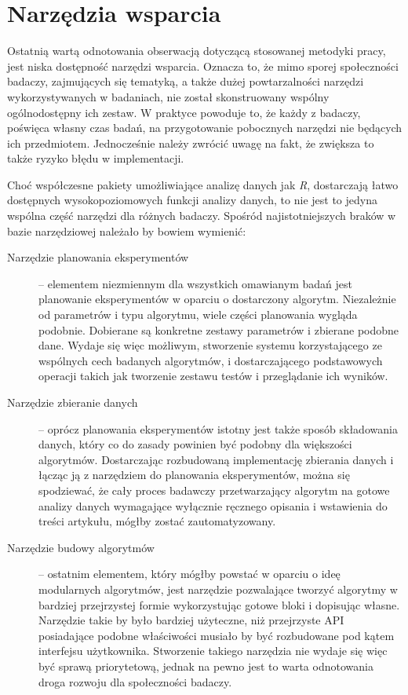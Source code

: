 \documentclass[12pt,a4paper]{report}
\begin{document}
{{{{{{{\section{Narzędzia wsparcia}
\par{
Ostatnią wartą odnotowania obserwacją dotyczącą stosowanej metodyki pracy, jest niska dostępność narzędzi wsparcia. Oznacza to, że mimo sporej społeczności badaczy, zajmujących się tematyką, a także dużej powtarzalności narzędzi wykorzystywanych w badaniach, nie został skonstruowany wspólny ogólnodostępny ich zestaw. W praktyce powoduje to, że każdy z badaczy, poświęca własny czas badań, na przygotowanie pobocznych narzędzi nie będących ich przedmiotem. Jednocześnie należy zwrócić uwagę na fakt, że zwiększa to także ryzyko błędu w implementacji.
}
\par{
Choć współczesne pakiety umożliwiające analizę danych jak \emph{R}, dostarczają łatwo dostępnych wysokopoziomowych funkcji analizy danych, to nie jest to jedyna wspólna część narzędzi dla różnych badaczy. Spośród najistotniejszych braków w bazie narzędziowej należało by bowiem wymienić:
\begin{description}
\item[Narzędzie planowania eksperymentów] -- elementem niezmiennym dla wszystkich omawianym badań jest planowanie eksperymentów w oparciu o dostarczony algorytm. Niezależnie od parametrów i typu algorytmu, wiele części planowania wygląda podobnie. Dobierane są konkretne zestawy parametrów i zbierane podobne dane. Wydaje się więc możliwym, stworzenie systemu korzystającego ze wspólnych cech badanych algorytmów, i dostarczającego podstawowych operacji takich jak tworzenie zestawu testów i przeglądanie ich wyników.
\item[Narzędzie zbieranie danych] -- oprócz planowania eksperymentów istotny jest także sposób składowania danych, który co do zasady powinien być podobny dla większości algorytmów. Dostarczając rozbudowaną implementację zbierania danych i łącząc ją z narzędziem do planowania eksperymentów, można się spodziewać, że cały proces badawczy przetwarzający algorytm na gotowe analizy danych wymagające wyłącznie ręcznego opisania i wstawienia do treści artykułu, mógłby zostać zautomatyzowany.
\item[Narzędzie budowy algorytmów] -- ostatnim elementem, który mógłby powstać w oparciu o ideę modularnych algorytmów, jest narzędzie pozwalające tworzyć algorytmy w bardziej przejrzystej formie wykorzystując gotowe bloki i dopisując własne. Narzędzie takie by było bardziej użyteczne, niż przejrzyste API posiadające podobne właściwości musiało by być rozbudowane pod kątem interfejsu użytkownika. Stworzenie takiego narzędzia nie wydaje się więc być sprawą priorytetową, jednak na pewno jest to warta odnotowania droga rozwoju dla społeczności badaczy.

\end{description}}}}}}}}}
\end{document}
